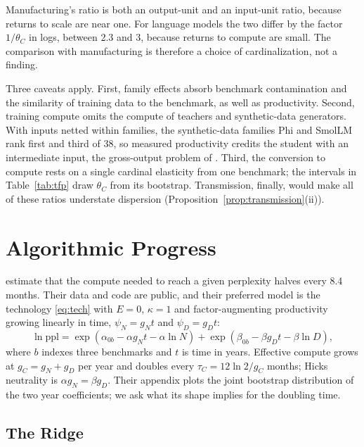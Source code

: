 \documentclass[AER,finalmode]{AEA}
\theoremstyle{definition}
\theoremstyle{remark}
\begin{document}
Manufacturing's ratio is both an output-unit and an input-unit ratio, because returns to scale are near one. For
language models the two differ by the factor $1/\theta_C$ in logs, between 2.3 and 3, because returns to compute are
small. The comparison with manufacturing is therefore a choice of cardinalization, not a finding.



Three caveats apply. First, family effects absorb benchmark contamination and the similarity of training data to the
benchmark, as well as productivity. Second, training compute omits the compute of teachers and synthetic-data
generators. With inputs netted within families, the synthetic-data families Phi and SmolLM rank first and third of 38,
so measured productivity credits the student with an intermediate input, the gross-output problem of
\citet{gandhi2020identification}. Third, the conversion to compute rests on a single cardinal elasticity from one
benchmark; the intervals in Table~\ref{tab:tfp} draw $\theta_C$ from its bootstrap. Transmission, finally, would make
all of these ratios understate dispersion (Proposition~\ref{prop:transmission}(ii)).

\section{Algorithmic Progress}\label{sec:progress}

\citet{ho2024algorithmic} estimate that the compute needed to reach a given perplexity halves every 8.4 months. Their
data and code are public, and their preferred model is the technology \eqref{eq:tech} with $E=0$, $\kappa=1$ and
factor-augmenting productivity growing linearly in time, $\psi_N=g_Nt$ and $\psi_D=g_Dt$:
\[
\ln\text{ppl}=\exp(\alpha_{0b}-\alpha g_Nt-\alpha\ln N)+\exp(\beta_{0b}-\beta g_Dt-\beta\ln D),
\]
where $b$ indexes three benchmarks and $t$ is time in years. Effective compute grows at $g_C=g_N+g_D$ per year and
doubles every $\tau_C=12\ln2/g_C$ months; Hicks neutrality is $\alpha g_N=\beta g_D$. Their appendix plots the joint
bootstrap distribution of the two year coefficients; we ask what its shape implies for the doubling time.

\subsection{The Ridge}
\end{document}
